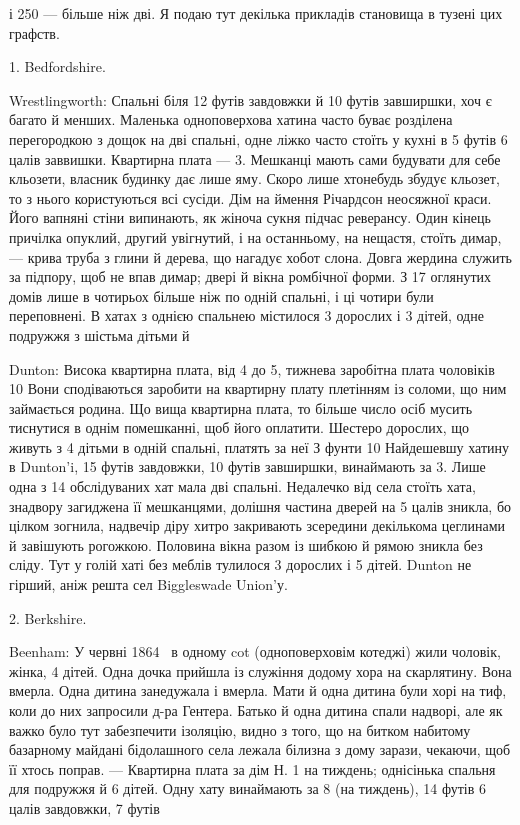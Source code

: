 \parcont{}  %
і 250 — більше ніж дві. Я подаю тут декілька прикладів становища
в тузені цих графств.

1. Bedfordshire.

Wrestlingworth: Спальні біля 12 футів завдовжки й 10 футів
завширшки, хоч є багато й менших. Маленька одноповерхова
хатина часто буває розділена перегородкою з дощок на дві
спальні, одне ліжко часто стоїть у кухні в 5 футів 6 цалів заввишки.
Квартирна плата — 3. Мешканці мають
сами будувати для себе кльозети, власник будинку дає лише
яму. Скоро лише хтонебудь збудує кльозет, то з нього користуються
всі сусіди. Дім на ймення Річардсон неосяжної краси.
Його вапняні стіни випинають, як жіноча сукня підчас реверансу.
Один кінець причілка опуклий, другий увігнутий, і на
останньому, на нещастя, стоїть димар, — крива труба з глини
й дерева, що нагадує хобот слона. Довга жердина служить за
підпору, щоб не впав димар; двері й вікна ромбічної форми.
З 17 оглянутих домів лише в чотирьох більше ніж по одній
спальні, і ці чотири були переповнені. В хатах з однією спальнею
містилося 3 дорослих і 3 дітей, одне подружжя з шістьма
дітьми й~

Dunton: Висока квартирна плата, від 4 до 5,
тижнева заробітна плата чоловіків 10 Вони сподіваються
заробити на квартирну плату плетінням із соломи, що ним займається
родина. Що вища квартирна плата, то більше число осіб
мусить тиснутися в однім помешканні, щоб його оплатити. Шестеро
дорослих, що живуть з 4 дітьми в одній спальні, платять за неї
З фунти 10 Найдешевшу хатину в Dunton’i, 15 футів
завдовжки, 10 футів завширшки, винаймають за 3.
Лише одна з 14 обслідуваних хат мала дві спальні. Недалечко
від села стоїть хата, знадвору загиджена її мешканцями, долішня
частина дверей на 5 цалів зникла, бо цілком зогнила, надвечір
діру хитро закривають зсередини декількома цеглинами й завішують
рогожкою. Половина вікна разом із шибкою й рямою
зникла без сліду. Тут у голій хаті без меблів тулилося 3 дорослих
і 5 дітей. Dunton не гірший, аніж решта сел Biggleswade Union’у.

2. Berkshire.

Beenham: У червні 1864~ в одному cot (одноповерховім
котеджі) жили чоловік, жінка, 4 дітей. Одна дочка прийшла із
служіння додому хора на скарлятину. Вона вмерла. Одна дитина
занедужала і вмерла. Мати й одна дитина були хорі на тиф, коли
до них запросили д-ра Гентера. Батько й одна дитина спали
надворі, але як важко було тут забезпечити ізоляцію, видно з
того, що на битком набитому базарному майдані бідолашного
села лежала білизна з дому зарази, чекаючи, щоб її хтось поправ.
— Квартирна плата за дім Н. 1 на тиждень; однісінька
спальня для подружжя й 6 дітей. Одну хату винаймають
за 8 (на тиждень), 14 футів 6 цалів завдовжки, 7 футів
\parbreak{}  %
